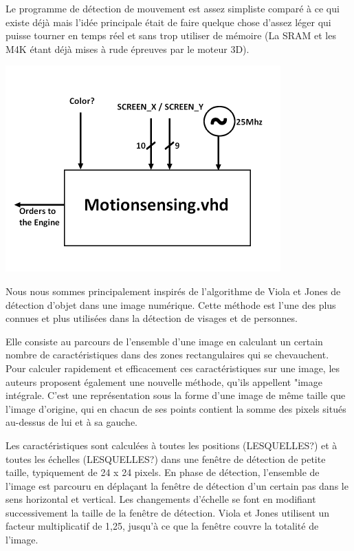\documentclass[10pt,a4paper]{report}
\begin{document}
Le programme de détection de mouvement est assez simpliste comparé à ce qui existe déjà mais l'idée principale était de faire quelque chose d'assez léger qui puisse tourner en temps réel et sans trop utiliser de mémoire (La SRAM et les M4K étant déjà mises à rude épreuves par le moteur 3D). 

\begin{center}
\includegraphics[width=300pt]{gfx/motionsensing.png}
\end{center}

Nous nous sommes principalement inspirés de l'algorithme de Viola et Jones de détection d'objet dans une image numérique. Cette méthode est l'une des plus connues et plus utilisées dans la détection de visages et de personnes. 

Elle consiste au parcours de l'ensemble d'une image en calculant un certain nombre de caractéristiques dans des zones rectangulaires qui se chevauchent. Pour calculer rapidement et efficacement ces caractéristiques sur une image, les auteurs proposent également une nouvelle méthode, qu'ils appellent "image intégrale. C'est une représentation sous la forme d'une image de même taille que l'image d'origine, qui en chacun de ses points contient la somme des pixels situés au-dessus de lui et à sa gauche.


Les caractéristiques sont calculées à toutes les positions (LESQUELLES?) et à toutes les échelles (LESQUELLES?) dans une fenêtre de détection de petite taille, typiquement de 24 x 24 pixels. En phase de détection, l'ensemble de l'image est parcouru en déplaçant la fenêtre de détection d'un certain pas dans le sens horizontal et vertical. Les changements d'échelle se font en modifiant successivement la taille de la fenêtre de détection. Viola et Jones utilisent un facteur multiplicatif de 1,25, jusqu'à ce que la fenêtre couvre la totalité de l'image.
\end{document}
